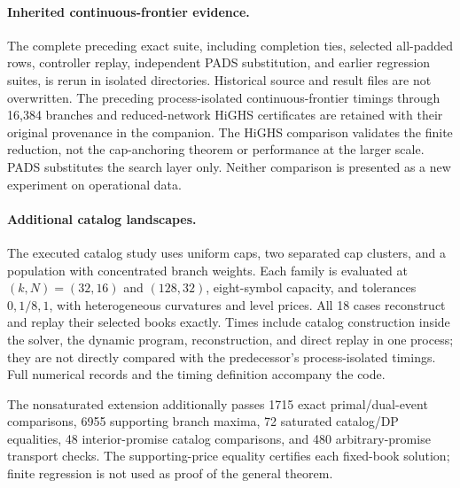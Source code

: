 \paragraph{Inherited continuous-frontier evidence.}
The complete preceding exact suite, including completion ties, selected all-padded rows, controller replay, independent PADS substitution, and earlier regression suites, is rerun in isolated directories. Historical source and result files are not overwritten. The preceding process-isolated continuous-frontier timings through 16,384 branches and reduced-network HiGHS certificates are retained with their original provenance in the companion. The HiGHS comparison validates the finite reduction, not the cap-anchoring theorem or performance at the larger scale. PADS substitutes the search layer only. Neither comparison is presented as a new experiment on operational data.

\paragraph{Additional catalog landscapes.}
The executed catalog study uses uniform caps, two separated cap clusters, and a population with concentrated branch weights. Each family is evaluated at $(k,N)=(32,16)$ and $(128,32)$, eight-symbol capacity, and tolerances $0,1/8,1$, with heterogeneous curvatures and level prices. All 18 cases reconstruct and replay their selected books exactly. Times include catalog construction inside the solver, the dynamic program, reconstruction, and direct replay in one process; they are not directly compared with the predecessor's process-isolated timings. Full numerical records and the timing definition accompany the code.

The nonsaturated extension additionally passes 1715 exact primal/dual-event comparisons, 6955 supporting branch maxima, 72 saturated catalog/DP equalities, 48 interior-promise catalog comparisons, and 480 arbitrary-promise transport checks. The supporting-price equality certifies each fixed-book solution; finite regression is not used as proof of the general theorem.

